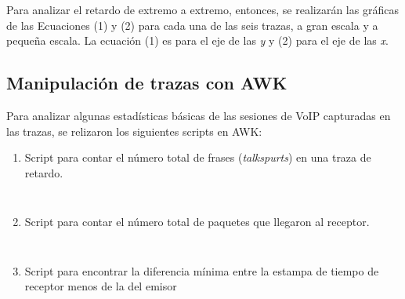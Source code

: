 \noindent Para analizar el retardo de extremo a extremo, entonces, se realizar\'an las gr\'aficas de las Ecuaciones (1) y (2)
para cada una de las seis trazas, a gran escala y a pequeña escala. La ecuaci\'on (1) es para el eje de las \textit{y} y (2)
para el eje de las \textit{x}.

\subsection*{Manipulaci\'on de trazas con AWK}
\noindent Para analizar algunas estad\'isticas b\'asicas de las sesiones de VoIP capturadas en las trazas, se relizaron los
siguientes scripts en AWK:
\begin{enumerate}
  \item Script para contar el n\'umero total de frases (\textit{talkspurts}) en una traza de retardo.
  \begin{figure}[H]
    \centering
    \begin{lstlisting}[frame=single, breaklines=true, basicstyle=\footnotesize\ttfamily, breakatwhitespace=false, 
        columns=flexible, tabsize=2, showstringspaces=false, language=AWK] 
      
    \end{lstlisting}
    \label{fig:scriptTalksprut}
  \end{figure}

  \item Script para contar el n\'umero total de paquetes que llegaron al receptor.
  \begin{figure}[H]
    \centering
    \begin{lstlisting}[frame=single, breaklines=true, basicstyle=\footnotesize\ttfamily, breakatwhitespace=false, 
        columns=flexible, tabsize=2, showstringspaces=false, language=AWK] 
  
    \end{lstlisting}
    \label{fig:scriptPaquetesRecibidos}
  \end{figure}

  \item Script para encontrar la diferencia m\'inima entre la estampa de tiempo de receptor menos de la del emisor
  \begin{figure}[H]
    \centering
    \begin{lstlisting}[frame=single, breaklines=true, basicstyle=\footnotesize\ttfamily, breakatwhitespace=false, 
        columns=flexible, tabsize=2, showstringspaces=false, language=AWK] 
  
    \end{lstlisting}
    \label{fig:scriptDiferencia}
  \end{figure}


\end{enumerate}
